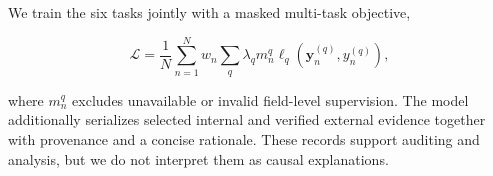 We train the six tasks jointly with a masked multi-task objective,

\begin{equation}
\mathcal{L}
=
\frac{1}{N}
\sum_{n=1}^{N}
w_n
\sum_{q}
\lambda_q m_n^q
\ell_q
\left(
\hat{\mathbf{y}}_n^{(q)},y_n^{(q)}
\right),
\label{eq:multitask_objective}
\end{equation}

where $m_n^q$ excludes unavailable or invalid field-level supervision.
The model additionally serializes selected internal and verified
external evidence together with provenance and a concise rationale.
These records support auditing and analysis, but we do not interpret
them as causal explanations.